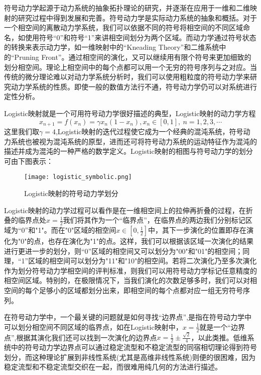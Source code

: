 符号动力学起源于动力系统的抽象拓扑理论的研究\cite{morse1938symbolic}，并逐渐在应用于一维和二维映射的研究过程中得到发展和完善\cite{crutchfield1982symbolic,cvitanovic2020chaos}。符号动力学是实际动力系统的抽象和概括。对于一个相空间的离散动力学系统，我们可以依据不同的符号将相空间的不同区域命名，如使用符号“0”和符号“1”来讲相空间划分为两个区域。而动力学通过符号状态的转换来表示动力学，如一维映射中的“Kneading Theory”\cite{devaney2008introduction,cvitanovic2020chaos}和二维系统中的“Pruning Front”\cite{cvitanovic2020chaos,d1990topology}。通过相空间的演化，又可以继续用有限个符号来更加细致的划分相空间。理论上相空间中的每个点都可以用一个无穷的符号序列与之对应。当传统的微分理论难以对动力学系统分析时，我们可以使用粗粒度的符号动力学来研究动力学系统的性质。即使一般的数值方法行不通，符号动力学仍可以对系统进行定性分析。

Logistic映射就是一个可用符号动力学很好描述的典型，Logistic映射的动力学方程
\begin{equation}
    x_{n+1}=f(x_n)=\gamma x_n (1-x_n ),x_n∈[0,1],\ n=1,2,3,\cdots
\end{equation}
这里我们取$\gamma=4$,Logistic映射的迭代过程使它成为一个经典的混沌系统，符号动力系统也被视为混沌系统的原型，进而还可将符号动力系统的运动特征作为混沌的描述并成为混沌的一种严格的数学定义。Logistic映射的相图与符号动力学的划分可由下图表示：
\begin{figure}
	\centering
	\texttt{[image: logistic\_symbolic.png]}
    \caption{Logistic映射的符号动力学划分}
    \label{fig:logi_symb}
\end{figure}
Logistic映射的动力学过程可以看作是在一维相空间上的拉伸再折叠的过程，在折叠的临界点处$x=\frac{1}{2}$我们将其作为一个“临界点”，在临界点的两边我们分别标记区域为“0”和"1"。而在"0"区域的相空间$x\in [0,\frac{1}{2}]$中，其下一步演化的位置即存在演化为"0"的点，也存在演化为"1"的点。这样，我们可以根据该区域一次演化的结果进行更进一步的划分，则“0”区域的相空间又可以划分为"00"和"01"的相空间；同理，“1”区域的相空间可以划分为"11"和"10"的相空间。若将二次演化乃至多次演化作为划分符号动力学相空间的评判标准，则我们可以用符号动力学标记任意精度的相空间区域。特别的，在极限情况下，当我们演化的次数足够多时，我们可以对相空间的每个足够小的区域都划分出来，即相空间的每个点都对应一组无穷符号序列。

在符号动力学中，一个最关键的问题就是如何寻找“边界点”\cite{hao1991symbolic},是指在符号动力学中可以划分相空间不同区域的临界点，如在Logistic映射中，$x=\frac{1}{2}$就是一个“边界点”,根据其演化我们还可以找到一次演化的边界点$x=\frac{1}{2}\pm\frac{\sqrt{2}}{4}$，以此类推。低维系统中的符号动力学边界点可以通过稳定流型和不稳定流型的同宿相切理论得到符号划分\cite{d1990topology,giovannini1992generating,grassberger1989symbolic}，而这种理论扩展到非线性系统(尤其是高维非线性系统)则便的很困难\cite{cvitanovic2020chaos,grassberger1989symbolic}，因为稳定流型和不稳定流型交织在一起，而很难用纯几何的方法进行描述\cite{biham1989characterization,jaeger1997structure,grassberger1985generating}。

